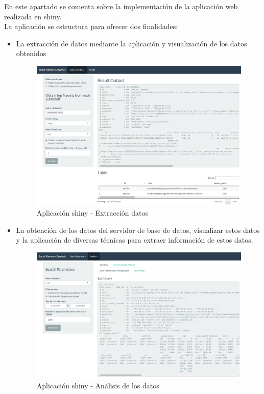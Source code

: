 \documentclass[../../main.tex]{subfiles}
\begin{document}
En este apartado se comenta sobre la implementación de la aplicación web realizada en \gls{shiny}.  \\

La aplicación se estructura para ofrecer dos finalidades:

\begin{itemize}
    \item La extracción de datos mediante la aplicación y visualización de los datos obtenidos
    \begin{figure}[H]
    \centering
    \includegraphics[width=400pt]{images/implementacion/app-extraction.png}
    \caption{Aplicación \Gls{shiny} - Extracción datos}
    \end{figure}
    \item La obtención de los datos del servidor de base de datos, visualizar estos datos y la aplicación de diversas técnicas para extraer información de estos datos.
    \begin{figure}[H]
    \centering
    \includegraphics[width=400pt]{images/implementacion/app-reddit.png}
    \caption{Aplicación \Gls{shiny} - Análisis de los datos}
    \end{figure}
\end{itemize}
\end{document}
